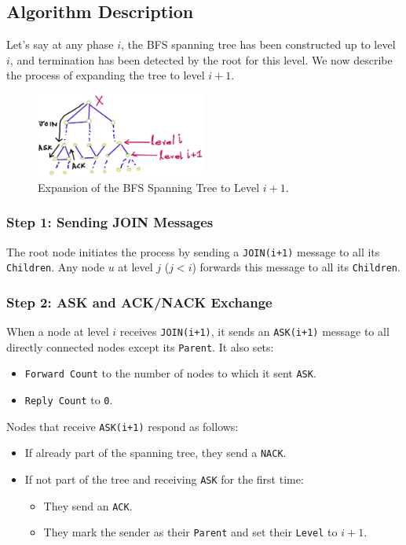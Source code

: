 \subsection{Algorithm Description}
Let's say at any phase \( i \), the BFS spanning tree has been constructed up to level \( i \), and termination has been detected by the root for this level. We now describe the process of expanding the tree to level \( i+1 \).

\begin{figure}[h]
    \centering
    \includegraphics[width=0.5\textwidth]{IMG/Q6.jpeg}
    \caption{Expansion of the BFS Spanning Tree to Level \( i+1 \).}
    \label{fig:BFS}
\end{figure}

\subsubsection{Step 1: Sending JOIN Messages}
The root node initiates the process by sending a \texttt{JOIN(i+1)} message to all its \texttt{Children}. Any node \( u \) at level \( j \) (\( j < i \)) forwards this message to all its \texttt{Children}.

\subsubsection{Step 2: ASK and ACK/NACK Exchange}
When a node at level \( i \) receives \texttt{JOIN(i+1)}, it sends an \texttt{ASK(i+1)} message to all directly connected nodes except its \texttt{Parent}. It also sets:
\begin{itemize}
    \item \texttt{Forward Count} to the number of nodes to which it sent \texttt{ASK}.
    \item \texttt{Reply Count} to \texttt{0}.
\end{itemize}

Nodes that receive \texttt{ASK(i+1)} respond as follows:
\begin{itemize}
    \item If already part of the spanning tree, they send a \texttt{NACK}.
    \item If not part of the tree and receiving \texttt{ASK} for the first time:
    \begin{itemize}
        \item They send an \texttt{ACK}.
        \item They mark the sender as their \texttt{Parent} and set their \texttt{Level} to \( i+1 \).
    \end{itemize}
\end{itemize}

